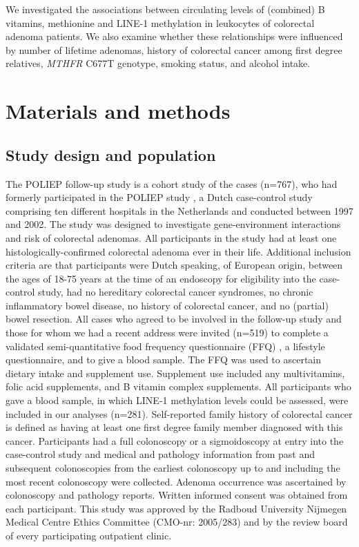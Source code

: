 \noindent We investigated the associations between circulating levels of (combined) B vitamins, methionine and LINE-1 methylation in leukocytes of colorectal adenoma patients. We also examine whether these relationships were influenced by number of lifetime adenomas, history of colorectal cancer among first degree relatives, \emph{MTHFR} C677T genotype, smoking status, and alcohol intake.

\section{Materials and methods} %
\subsection{Study design and population} %
\noindent The POLIEP follow-up study is a cohort study of the cases (n=767), who had formerly participated in the POLIEP study \cite{c543}, a Dutch case-control study comprising ten different hospitals in the Netherlands and conducted between 1997 and 2002. The study was designed to investigate gene-environment interactions and risk of colorectal adenomas. All participants in the study had at least one histologically-confirmed colorectal adenoma ever in their life. Additional inclusion criteria are that participants were Dutch speaking, of European origin, between the ages of 18-75 years at the time of an endoscopy for eligibility into the case-control study, had no hereditary colorectal cancer syndromes, no chronic inflammatory bowel disease, no history of colorectal cancer, and no (partial) bowel resection. All cases who agreed to be involved in the follow-up study and those for whom we had a recent address were invited (n=519) to complete a validated semi-quantitative food frequency questionnaire (FFQ) \cite{c544}, a lifestyle questionnaire, and to give a blood sample. The FFQ was used to ascertain dietary intake and supplement use. Supplement use included any multivitamins, folic acid supplements, and B vitamin complex supplements. All participants who gave a blood sample, in which LINE-1 methylation levels could be assessed, were included in our analyses (n=281). Self-reported family history of colorectal cancer is defined as having at least one first degree family member diagnosed with this cancer. Participants had a full colonoscopy or a sigmoidoscopy at entry into the case-control study and medical and pathology information from past and subsequent colonoscopies from the earliest colonoscopy up to and including the most recent colonoscopy were collected. Adenoma occurrence was ascertained by colonoscopy and pathology reports. Written informed consent was obtained from each participant. This study was approved by the Radboud University Nijmegen Medical Centre Ethics Committee (CMO-nr: 2005/283) and by the review board of every participating outpatient clinic.


